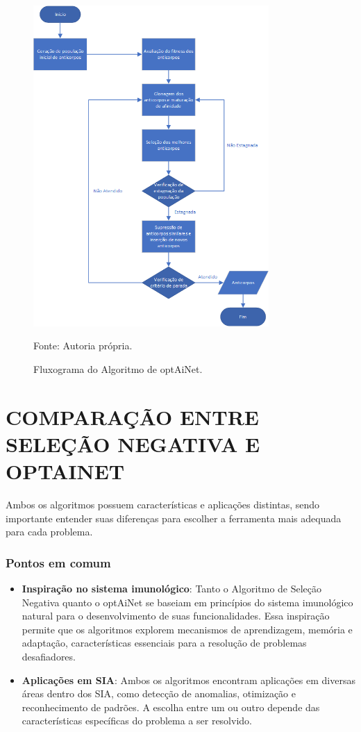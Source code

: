 \begin{figure}[H]
\centering
\includegraphics[width=0.8\textwidth]{imgs/algoritmo_optainet.png}
\caption{Fluxograma do Algoritmo de optAiNet.}
\label{fig:fluxograma_optainet}
Fonte: Autoria própria.
\end{figure}

\chapter{\MakeUppercase{Comparação entre Seleção Negativa e optAiNet}}
\thispagestyle{mystyle}

Ambos os algoritmos possuem características e aplicações distintas, sendo importante entender suas diferenças para escolher a ferramenta mais adequada para cada problema.

\subsection{Pontos em comum}

\begin{itemize}
    \item \textbf{Inspiração no sistema imunológico}: Tanto o Algoritmo de Seleção Negativa quanto o optAiNet se baseiam em princípios do sistema imunológico natural para o desenvolvimento de suas funcionalidades. Essa inspiração permite que os algoritmos explorem mecanismos de aprendizagem, memória e adaptação, características essenciais para a resolução de problemas desafiadores.
    
    \item \textbf{Aplicações em SIA}: Ambos os algoritmos encontram aplicações em diversas áreas dentro dos SIA, como detecção de anomalias, otimização e reconhecimento de padrões. A escolha entre um ou outro depende das características específicas do problema a ser resolvido.
\end{itemize}

